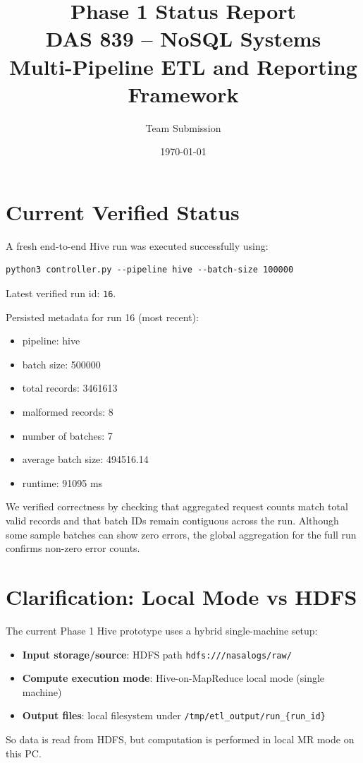 \documentclass[12pt,a4paper]{article}
\title{\textbf{Phase 1 Status Report}\\DAS 839 -- NoSQL Systems\\Multi-Pipeline ETL and Reporting Framework}
\author{Team Submission}
\date{\today}
\begin{document}
\maketitle

\section{Current Verified Status}
A fresh end-to-end Hive run was executed successfully using:
\begin{lstlisting}
python3 controller.py --pipeline hive --batch-size 100000
\end{lstlisting}
Latest verified run id: \texttt{16}.

Persisted metadata for run 16 (most recent):
\begin{itemize}
        \item pipeline: hive
    \item batch size: 500000
    \item total records: 3461613
    \item malformed records: 8
    \item number of batches: 7
    \item average batch size: 494516.14
    \item runtime: 91095 ms
\end{itemize}
We verified correctness by checking that aggregated request counts match total valid records and that batch IDs remain contiguous across the run.
Although some sample batches can show zero errors, the global aggregation for the full run confirms non-zero error counts.

\section{Clarification: Local Mode vs HDFS}
The current Phase 1 Hive prototype uses a hybrid single-machine setup:
\begin{itemize}
    \item \textbf{Input storage/source}: HDFS path \texttt{hdfs:///nasalogs/raw/}
    \item \textbf{Compute execution mode}: Hive-on-MapReduce local mode (single machine)
    \item \textbf{Output files}: local filesystem under \texttt{/tmp/etl\_output/run\_\{run\_id\}}
\end{itemize}

So data is read from HDFS, but computation is performed in local MR mode on this PC.
\end{document}
